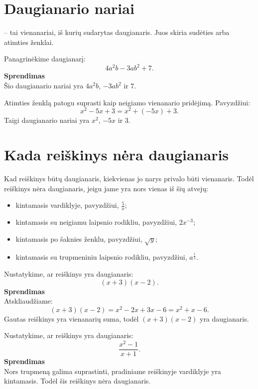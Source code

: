 \documentclass[11pt,a4paper]{scrartcl}
\begin{document}
\section{Daugianario nariai}

\begin{definition}
 -- tai vienanariai, iš kurių sudarytas daugianaris. Juos skiria sudėties arba atimties ženklai.
\end{definition}

\begin{example}
Panagrinėkime daugianarį:
\[
4a^2b-3ab^2+7.
\]
\textbf{Sprendimas}\\
Šio daugianario nariai yra $4a^2b$, $-3ab^2$ ir $7$.
\end{example}

\begin{remark}
Atimties ženklą patogu suprasti kaip neigiamo vienanario pridėjimą. Pavyzdžiui:
\[
x^2-5x+3=x^2+(-5x)+3.
\]
Taigi daugianario nariai yra $x^2$, $-5x$ ir $3$.
\end{remark}

\section{Kada reiškinys nėra daugianaris}

Kad reiškinys būtų daugianaris, kiekvienas jo narys privalo būti vienanaris. Todėl reiškinys nėra daugianaris, jeigu jame yra nors vienas iš šių atvejų:
\begin{itemize}
	\item kintamasis vardiklyje, pavyzdžiui, $\frac{5}{x}$;
	\item kintamasis su neigiamu laipsnio rodikliu, pavyzdžiui, $2x^{-3}$;
	\item kintamasis po šaknies ženklu, pavyzdžiui, $\sqrt{y}$;
	\item kintamasis su trupmeniniu laipsnio rodikliu, pavyzdžiui, $a^{\frac{1}{2}}$.
\end{itemize}

\begin{example}
Nustatykime, ar reiškinys yra daugianaris:
\[
(x+3)(x-2).
\]
\textbf{Sprendimas}\\
Atskliaudžiame:
\[
(x+3)(x-2)=x^2-2x+3x-6=x^2+x-6.
\]
Gautas reiškinys yra vienanarių suma, todėl $(x+3)(x-2)$ yra daugianaris.
\end{example}

\begin{example}
Nustatykime, ar reiškinys yra daugianaris:
\[
\frac{x^2-1}{x+1}.
\]
\textbf{Sprendimas}\\
Nors trupmeną galima suprastinti, pradiniame reiškinyje vardiklyje yra kintamasis. Todėl šis reiškinys nėra daugianaris.
\end{example}
\end{document}
